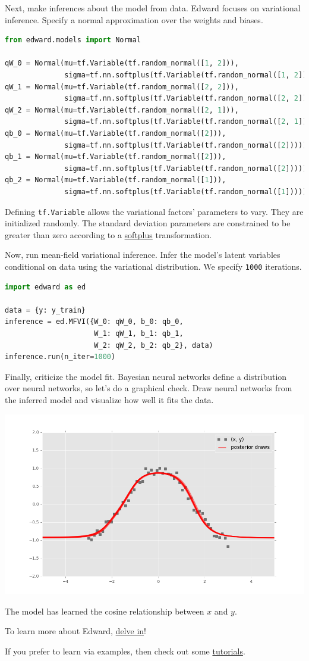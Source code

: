 Next, make inferences about the model from data.
Edward focuses on variational inference. Specify a normal
approximation over the weights and biases.
\begin{lstlisting}[language=Python]
from edward.models import Normal

qW_0 = Normal(mu=tf.Variable(tf.random_normal([1, 2])),
              sigma=tf.nn.softplus(tf.Variable(tf.random_normal([1, 2]))))
qW_1 = Normal(mu=tf.Variable(tf.random_normal([2, 2])),
              sigma=tf.nn.softplus(tf.Variable(tf.random_normal([2, 2]))))
qW_2 = Normal(mu=tf.Variable(tf.random_normal([2, 1])),
              sigma=tf.nn.softplus(tf.Variable(tf.random_normal([2, 1]))))
qb_0 = Normal(mu=tf.Variable(tf.random_normal([2])),
              sigma=tf.nn.softplus(tf.Variable(tf.random_normal([2]))))
qb_1 = Normal(mu=tf.Variable(tf.random_normal([2])),
              sigma=tf.nn.softplus(tf.Variable(tf.random_normal([2]))))
qb_2 = Normal(mu=tf.Variable(tf.random_normal([1])),
              sigma=tf.nn.softplus(tf.Variable(tf.random_normal([1]))))
\end{lstlisting}
Defining \texttt{tf.Variable} allows the variational factors'
parameters to vary. They are initialized randomly.  The standard
deviation parameters are constrained to be greater than zero according
to a
\href{https://en.wikipedia.org/wiki/Rectifier_(neural_networks)}{softplus}
transformation.

Now, run mean-field variational inference. Infer the model's latent variables
conditional on data using the variational distribution.
We specify \texttt{1000} iterations.
\begin{lstlisting}[language=Python]
import edward as ed

data = {y: y_train}
inference = ed.MFVI({W_0: qW_0, b_0: qb_0,
                     W_1: qW_1, b_1: qb_1,
                     W_2: qW_2, b_2: qb_2}, data)
inference.run(n_iter=1000)
\end{lstlisting}

Finally, criticize the model fit. Bayesian neural networks define a
distribution over neural networks, so let's do a graphical check. Draw
neural networks from the inferred model and visualize how well it
fits the data.

\includegraphics[width=700px]{images/getting-started-fig1.png}

The model has learned the cosine relationship between $x$ and $y$.

To learn more about Edward, \href{delving-in}{delve in}!

If you prefer to learn via examples, then check out some
\href{tutorials}{tutorials}.
